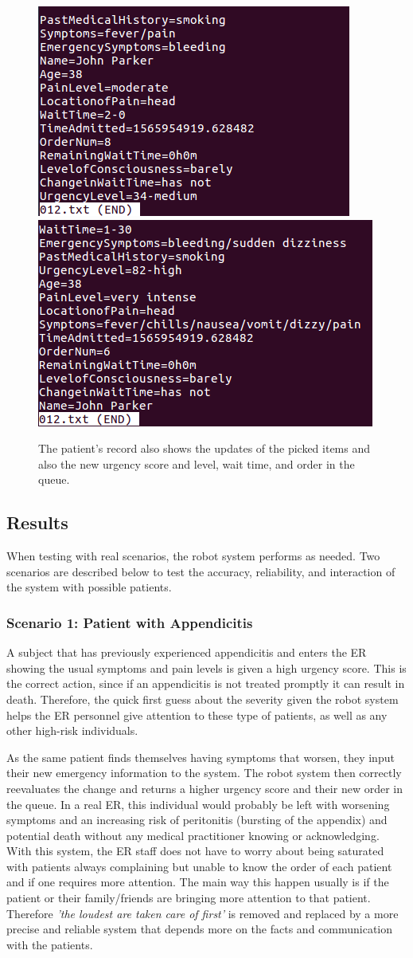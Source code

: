 \documentclass[letterpaper]{article}
\begin{document}
\begin{figure}[H]
  \centering
  \includegraphics[width=.25\textwidth]{RecordChange012-before.png}\hfill
  \includegraphics[width=.25\textwidth]{RecordChange012-after.png}\hfill \caption{The patient's record also shows the updates of the picked items and also the new urgency score and level, wait time, and order in the queue.}
\end{figure}

\subsection{Results}
When testing with real scenarios, the robot system performs as needed. Two scenarios are described below to test the accuracy, reliability, and interaction of the system with possible patients. 

\subsubsection{Scenario 1: Patient with Appendicitis}
A subject that has previously experienced appendicitis and enters the ER showing the usual symptoms and pain levels is given a high urgency score. This is the correct action, since if an appendicitis is not treated promptly it can result in death. Therefore, the quick first guess about the severity given the robot system helps the ER personnel give attention to these type of patients, as well as any other high-risk individuals. 

As the same patient finds themselves having symptoms that worsen, they input their new emergency information to the system. The robot system then correctly reevaluates the change and returns a higher urgency score and their new order in the queue. In a real ER, this individual would probably be left with worsening symptoms and an increasing risk of peritonitis (bursting of the appendix) and potential death without any medical practitioner knowing or acknowledging. With this system, the ER staff does not have to worry about being saturated with patients always complaining but unable to know the order of each patient and if one requires more attention. The main way this happen usually is if the patient or their family/friends are bringing more attention to that patient. Therefore \textit{'the loudest are taken care of first'} is removed and replaced by a more precise and reliable system that depends more on the facts and communication with the patients.
\end{document}
